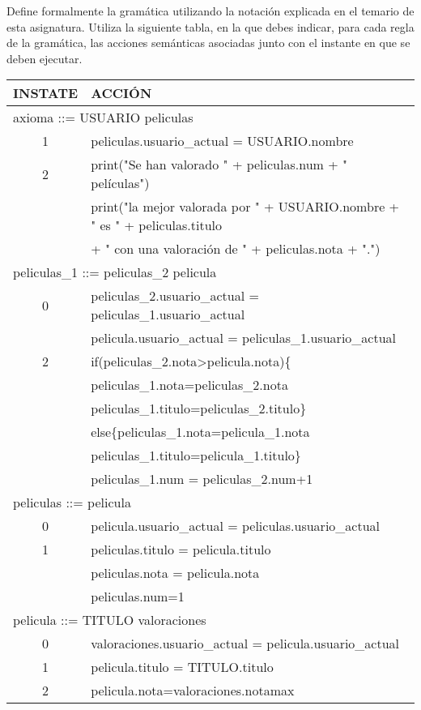 \documentclass[nochap]{apuntes}
\begin{document}
\begin{problem}
Define formalmente la gramática utilizando la notación explicada en el temario de esta asignatura. Utiliza la siguiente tabla, en la que debes indicar, para cada regla de la gramática, las acciones semánticas asociadas junto con el instante en que se deben ejecutar.
\solution
\begin{tabular}{|c|l|}
\hline
INSTATE & ACCIÓN \\
\hline
\multicolumn{2}{|l|}{axioma ::= USUARIO peliculas} \\
\hline
 1 & peliculas.usuario\_actual = USUARIO.nombre \\
\hline
 2 & print("Se han valorado " + peliculas.num + " películas") \\
 & print("la mejor valorada por " + USUARIO.nombre + " es " + peliculas.titulo \\ & + " con una valoración de " + peliculas.nota + ".")\\
 \hline
\multicolumn{2}{|l|}{peliculas\_1 ::= peliculas\_2 pelicula} \\
\hline
 0 & peliculas\_2.usuario\_actual = peliculas\_1.usuario\_actual \\ & pelicula.usuario\_actual = peliculas\_1.usuario\_actual\\
 \hline
 2 & if(peliculas\_2.nota>pelicula.nota)\{\\ &
 peliculas\_1.nota=peliculas\_2.nota\\ &
 peliculas\_1.titulo=peliculas\_2.titulo\}\\ &
 else\{peliculas\_1.nota=pelicula\_1.nota\\ &
 peliculas\_1.titulo=pelicula\_1.titulo\}\\ &
 peliculas\_1.num = peliculas\_2.num+1\\
\hline
\multicolumn{2}{|l|}{peliculas ::= pelicula} \\
\hline
 0 & pelicula.usuario\_actual = peliculas.usuario\_actual \\
 \hline
 1 & peliculas.titulo = pelicula.titulo \\ & peliculas.nota = pelicula.nota \\ &
 peliculas.num=1\\
\hline
\multicolumn{2}{|l|}{pelicula ::= TITULO valoraciones} \\
\hline
0 & valoraciones.usuario\_actual = pelicula.usuario\_actual \\
 \hline
 1 & pelicula.titulo = TITULO.titulo \\
 \hline
 2 & pelicula.nota=valoraciones.notamax\\

\end{tabular}
\end{problem}
\end{document}
